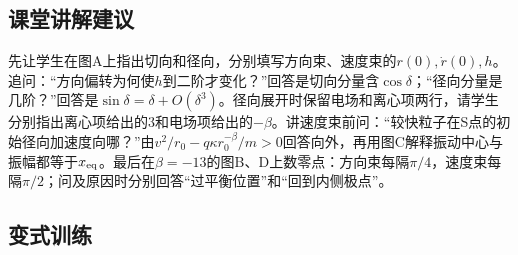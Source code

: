 \documentclass[UTF8,fontset=fandol,a4paper,11pt]{ctexart}
\begin{document}


\subsection*{课堂讲解建议}

先让学生在图A上指出切向和径向，分别填写方向束、速度束的$r(0),\dot r(0),h$。追问：“方向偏转为何使$h$到二阶才变化？”回答是切向分量含$\cos\delta$；“径向分量是几阶？”回答是$\sin\delta=\delta+O(\delta^3)$。径向展开时保留电场和离心项两行，请学生分别指出离心项给出的$3$和电场项给出的$-\beta$。讲速度束前问：“较快粒子在S点的初始径向加速度向哪？”由$v^2/r_0-q\kappa r_0^{-\beta}/m>0$回答向外，再用图C解释振动中心与振幅都等于$x_{\rm eq}$。最后在$\beta=-13$的图B、D上数零点：方向束每隔$\pi/4$，速度束每隔$\pi/2$；问及原因时分别回答“过平衡位置”和“回到内侧极点”。



\subsection*{变式训练}
\end{document}
